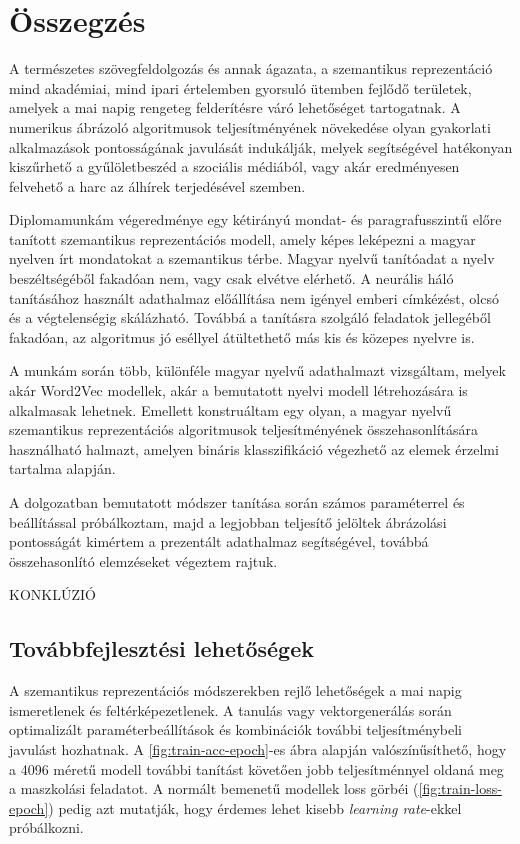 \chapter{Összegzés} %
\label{ch:sum}

A természetes szövegfeldolgozás és annak ágazata, a szemantikus reprezentáció mind akadémiai, mind ipari értelemben gyorsuló ütemben fejlődő területek, amelyek a mai napig rengeteg felderítésre váró lehetőséget tartogatnak. A numerikus ábrázoló algoritmusok teljesítményének növekedése olyan gyakorlati alkalmazások pontosságának javulását indukálják, melyek segítségével hatékonyan kiszűrhető a gyűlöletbeszéd a szociális médiából, vagy akár eredményesen felvehető a harc az álhírek terjedésével szemben. 

Diplomamunkám végeredménye egy kétirányú mondat- és paragrafusszintű előre tanított szemantikus reprezentációs modell, amely képes leképezni a magyar nyelven írt mondatokat a szemantikus térbe. Magyar nyelvű tanítóadat a nyelv beszéltségéből fakadóan nem, vagy csak elvétve elérhető. A neurális háló tanításához használt adathalmaz előállítása nem igényel emberi címkézést, olcsó és a végtelenségig skálázható. Továbbá a tanításra szolgáló feladatok jellegéből fakadóan, az algoritmus jó eséllyel átültethető más kis és közepes nyelvre is.

A munkám során több, különféle magyar nyelvű adathalmazt vizsgáltam, melyek akár Word2Vec modellek, akár a bemutatott nyelvi modell létrehozására is alkalmasak lehetnek. Emellett konstruáltam egy olyan, a magyar nyelvű szemantikus reprezentációs algoritmusok teljesítményének összehasonlítására használható halmazt, amelyen bináris klasszifikáció végezhető az elemek érzelmi tartalma alapján.
 
A dolgozatban bemutatott módszer tanítása során számos paraméterrel és beállítással próbálkoztam, majd a legjobban teljesítő jelöltek ábrázolási pontosságát  kimértem a prezentált adathalmaz segítségével, továbbá összehasonlító elemzéseket végeztem rajtuk.

KONKLÚZIÓ

\section{Továbbfejlesztési lehetőségek}
A szemantikus reprezentációs módszerekben rejlő lehetőségek a mai napig ismeretlenek és feltérképezetlenek. A tanulás vagy vektorgenerálás során optimalizált paraméterbeállítások és kombinációk további teljesítménybeli javulást hozhatnak. A \ref{fig:train-acc-epoch}-es ábra alapján valószínűsíthető, hogy a 4096 méretű modell további tanítást követően jobb teljesítménnyel oldaná meg a maszkolási feladatot. A normált bemenetű modellek loss görbéi (\ref{fig:train-loss-epoch}) pedig azt mutatják, hogy érdemes lehet kisebb \textit{learning rate}-ekkel próbálkozni.

